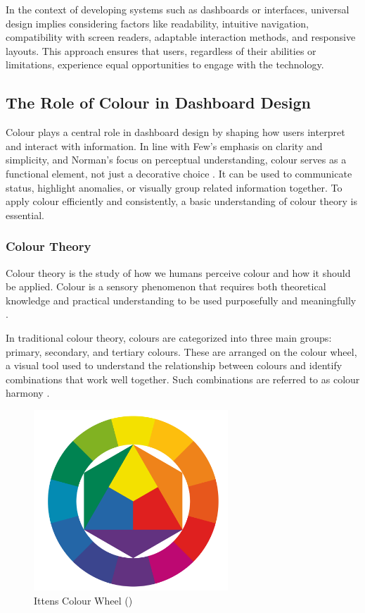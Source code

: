 In the context of developing systems such as dashboards or interfaces, universal design implies considering factors like readability, intuitive navigation, compatibility with screen readers, adaptable interaction methods, and responsive layouts. This approach ensures that users, regardless of their abilities or limitations, experience equal opportunities to engage with the technology.


\subsection{The Role of Colour in Dashboard Design}
\label{subsec:colour_theory}

Colour plays a central role in dashboard design by shaping how users interpret and interact with information. In line with Few's emphasis on clarity and simplicity, and Norman's focus on perceptual understanding, colour serves as a functional element, not just a decorative choice \autocite{Figma}. It can be used to communicate status, highlight anomalies, or visually group related information together. To apply colour efficiently and consistently, a basic understanding of colour theory is essential.

\subsubsection{Colour Theory}
\label{subsubsec:col_theo}

Colour theory is the study of how we humans perceive colour and how it should be applied. Colour is a sensory phenomenon that requires both theoretical knowledge and practical understanding to be used purposefully and meaningfully \autocite{snl}.

In traditional colour theory, colours are categorized into three main groups: primary, secondary, and tertiary colours. These  are arranged on the colour wheel, a visual tool used to understand the relationship between colours and identify combinations that work well together. Such combinations are referred to as colour harmony \autocite{Canva}.

\begin{figure}[H]
        \centering
        \includegraphics[width=0.65\textwidth]{figures/Ittens colour wheel.png}
        \caption{Ittens Colour Wheel (\cite{fargebilde})}
        \label{fig:colour_wheel}
\end{figure}


